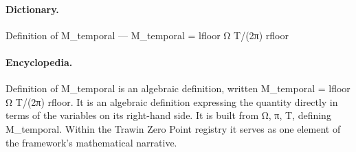 \paragraph{Dictionary.}
Definition of M\_temporal — M\_temporal = lfloor Ω T/(2π) rfloor

\paragraph{Encyclopedia.}
Definition of M\_temporal is an algebraic definition, written M\_temporal = lfloor Ω T/(2π) rfloor. It is an algebraic definition expressing the quantity directly in terms of the variables on its right-hand side. It is built from Ω, π, T, defining M\_temporal. Within the Trawin Zero Point registry it serves as one element of the framework's mathematical narrative.
